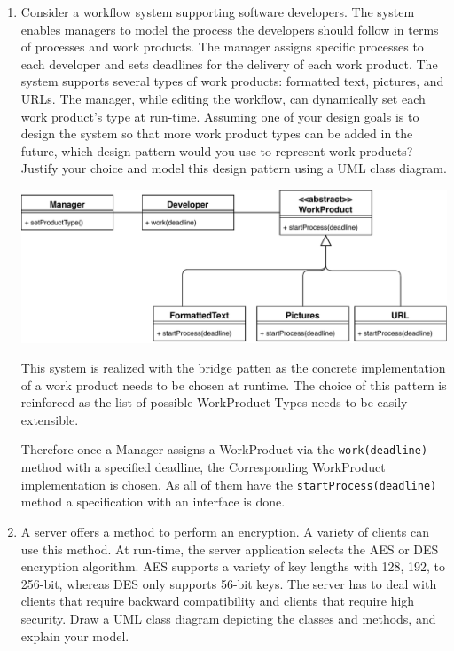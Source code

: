 \documentclass[a4paper, 10pt]{article}
\begin{document}
\begin{enumerate}
    \item Consider a workflow system supporting software developers. 
    The system enables managers to model the process the developers should follow in 
    terms of processes and work products. The manager assigns specific processes to each developer and sets deadlines 
    for the delivery of each work product. The system supports several types of work products: 
    formatted text, pictures, and URLs. The manager, while editing the workflow, can dynamically set each 
    work product’s type at run-time. 
    Assuming one of your design goals is to design the system so that more work product types can be added in the future, 
    which design pattern would you use to represent work products? 
    Justify your choice and model this design pattern using a UML class diagram.
    \vspace{0.5cm}

    \begin{center}
        \includegraphics[width=15cm]{Task03.pdf}
    \end{center}

    This system is realized with the bridge patten as the concrete implementation of a 
    work product needs to be chosen at runtime. The choice of this pattern is reinforced as 
    the list of possible WorkProduct Types needs to be easily extensible.

    Therefore once a Manager assigns a WorkProduct via the \verb+work(deadline)+ method with a specified deadline,
    the Corresponding WorkProduct implementation is chosen. As all of them have the \verb+startProcess(deadline)+ method 
    a specification with an interface  is done.

    \item
    A server offers a method to perform an encryption. 
    A variety of clients can use this method. At run-time, 
    the server application selects the AES or DES encryption algorithm. 
    AES supports a variety of key lengths with 128, 192, to 256-bit, whereas DES only supports 56-bit keys. 
    The server has to deal with clients that require backward compatibility and clients that require high security. 
    Draw a UML class diagram depicting the classes and methods, and explain your model.
    \vspace{0.5cm}


\end{enumerate}
\end{document}
